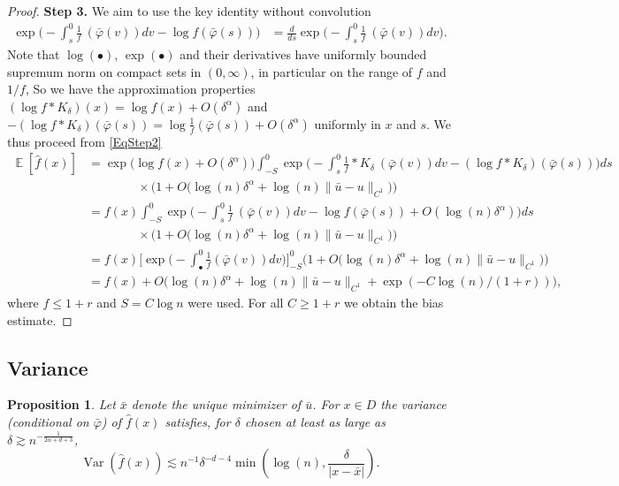 \documentclass{article}
\numberwithin{equation}{section}
\newtheorem{proposition}[satz]{Proposition}
\theoremstyle{definition}
\DeclareMathOperator{\E}{{\mathbb E}}
\renewcommand{\cdot}{{\scriptstyle \bullet} }
\providecommand{\norm}[1]{\lVert #1 \rVert}
\renewcommand{\le}{\leqslant}
\renewcommand{\ge}{\geqslant}
\begin{document}
\begin{proof}
\noindent \textbf{Step 3.}
We aim to use the key identity without convolution
\begin{align*}
    \exp\Big(-\int_s^0 \frac 1{f}  ~(\bar \varphi (v)) dv - \log f  (\bar \varphi(s)) \Big)
    &= \frac{d}{ds}\exp\Big(-\int_s^0 \frac 1{f}  ~(\bar \varphi (v)) dv\Big).
\end{align*}
Note that $\log(\cdot)$, $\exp(\cdot)$ and their derivatives have uniformly bounded supremum norm  on compact sets in $(0,\infty)$, in particular on the  range of $f$ and $1/f$,
So we have the approximation properties $ (\log f \ast K_\delta )(x) = \log f(x) + O(\delta^\alpha)$ and $ -(\log f \ast K_\delta )(\bar \varphi(s)) = \log \frac {1}{f}(\bar \varphi(s)) + O(\delta^\alpha)$ uniformly in $x$ and $s$. We thus proceed from \eqref{EqStep2}
\begin{align*}
\E[\hat f(x)]    &= \exp\Big(\log f(x) + O(\delta^\alpha) \Big) \int_{-S}^0 \exp\Big( -\int_s^0 \frac 1{f} \ast K_\delta ~(\bar \varphi (v)) dv - (\log f \ast K_\delta )(\bar \varphi(s)) \Big) ds \\
    &\qquad\qquad \times\Big(1+O\big(\log(n)\delta^\alpha+\log(n)\norm{\bar u-u}_{C^1}\big)\Big)\\
    &=   f(x)  \int_{-S}^0 \exp\Big(-\int_s^0 \frac 1{f}  ~(\bar \varphi (v)) dv - \log f  (\bar \varphi(s)) +O(\log(n)\delta^\alpha)\Big) ds \\
    &\qquad\qquad \times\Big(1+O\big(\log(n)\delta^\alpha+\log(n)\norm{\bar u-u}_{C^1}\big)\Big)\\
    &=  {f}(x) \Big[\exp \Big(-\int_\cdot^0 \frac 1{f} (\bar\varphi (v)) dv \Big)\Big]_{-S}^0 \Big(1+O\big(\log(n)\delta^\alpha+\log(n)\norm{\bar u-u}_{C^1}\big)\Big)\\
    &=f(x) + O\Big(\log(n)\delta^\alpha+\log(n)\norm{\bar u-u}_{C^1}+\exp(-C\log (n)/(1+r) ) \Big),
\end{align*}
where  $f\le 1+r$ and $S=C\log n$ were used. For all $C\ge 1+r$ we obtain the bias estimate.
\end{proof}


\subsection{Variance}


\begin{proposition}
    Let $\bar x$ denote the unique minimizer of $\bar u$. 
    For $x\in D$ the variance (conditional on $\bar \varphi$) of $\hat f(x)$ satisfies, for $\delta$ chosen at least as large as $\delta\gtrsim n^{-\frac{1}{2\alpha+d+3}}$,
    \[
\operatorname{Var}(\hat f(x))
\lesssim n^{-1}
\delta^{-d-4}
\min\left(\log(n),\frac{\delta}{|x-\bar x|}\right).
\]
\end{proposition}
\end{document}
